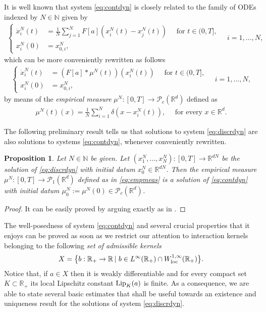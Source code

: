 \documentclass[A4paper,11pt]{article}
\newtheorem{proposition}[theorem]{Proposition}
\theoremstyle{definition}
\newcommand{\Lip}{\textup{Lip}}
\newcommand{\loc}{\textup{loc}}
\newcommand{\N}{\mathbb{N}}
\newcommand{\R}{\mathbb{R}}
\newcommand{\PP}{\mathcal{P}_1}
\newcommand{\PC}{\mathcal{P}_c}
\begin{document}
It is well known that system \eqref{eq:contdyn} is closely related to the family of ODEs indexed by $N \in \N$ given by
\begin{align}\label{eq:discrdyn}
\left\{\begin{aligned}
\dot{x}^N_i(t) &= \frac{1}{N}\sum^N_{j = 1}F[a](x^N_i(t) - x^N_j(t)) \quad \text{ for } t \in (0,T],\\
x_i^N(0) &= x^N_{0,i},
\end{aligned} \quad i = 1, \ldots, N, \right.
\end{align}
which can be more conveniently rewritten as follows
\begin{align}\label{eq:discr1}
\left\{\begin{aligned}
\dot{x}^N_i(t) &= (F[a]*\mu^N(t))(x^N_i(t)) \quad \text{ for } t \in (0,T],\\
x^N_i(0) &= x^N_{0,i},
\end{aligned} \quad i = 1, \ldots, N, \right.
\end{align}
by means of the \textit{empirical measure} $\mu^N:[0,T]\rightarrow\PC(\R^d)$ defined as
\begin{align}\label{eq:empmeas}
\mu^N(t)(x) = \frac{1}{N}\sum^N_{i = 1} \delta(x - x^N_i(t)), \quad \text{ for every } x \in \R^d.
\end{align}


The following preliminary result tells us that solutions to system \eqref{eq:discrdyn} are also solutions to systems \eqref{eq:contdyn}, whenever conveniently rewritten.

\begin{proposition}\label{p-rewritten}
Let $N \in \N$ be given. Let $(x^N_1, \ldots, x^N_N):[0,T] \rightarrow \R^{dN}$ be the solution of \eqref{eq:discrdyn} with initial datum $x^{N}_0 \in \R^{dN}$. Then the empirical measure $\mu^N:[0,T] \rightarrow \PP(\R^d)$ defined as in \eqref{eq:empmeas} is a solution of \eqref{eq:contdyn} with initial datum $\mu^{N}_0 := \mu^N(0) \in \PC(\R^d)$.
\end{proposition}
\begin{proof}
It can be easily proved by arguing exactly as in \cite[Lemma 4.3]{MFOC}.
\end{proof}

The well-posedness of system \eqref{eq:contdyn} and several crucial properties that it enjoys can be proved as soon as we restrict our attention to interaction kernels belonging to the following \textit{set of admissible kernels}
\begin{align*}
	X=\bigl\{b:\R_+\rightarrow\R\,|\ b \in L^{\infty}(\R_+) \cap W^{1,\infty}_\loc(\R_+) \bigr \}.
\end{align*}
Notice that, if $a \in X$ then it is weakly differentiable and for every compact set $K \subset \R_+$ its local Lipschitz constant $\Lip_{K}(a)$ is finite. As a consequence, we are able to state several basic estimates that shall be useful towards an existence and uniqueness result for the solutions of system \eqref{eq:discrdyn}.
\end{document}
